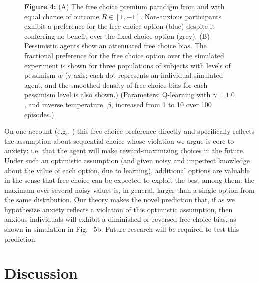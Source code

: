 \documentclass[11pt]{article} %
\begin{document}
\begin{figure}[!b]
  \centerline{%
  }
  \par \textbf{Figure 4:} (A) The free choice premium paradigm from \cite{Leotti2011} and \cite{Leotti2014} with equal chance of outcome $R \in [1, -1]$. Non-anxious participants exhibit a preference for the free choice option (blue) despite it conferring no benefit over the fixed choice option (grey). (B) Pessimistic agents show an attenuated free choice bias. The fractional preference for the free choice option over the simulated experiment is shown for three populations of subjects with levels of pessimism $w$ (y-axis; each dot represents an individual simulated agent, and the smoothed density of free choice bias for each pessimism level is also shown.)
  (Parameters: Q-learning with $\gamma = 1.0$, and inverse temperature, $\beta$, increased from 1 to 10 over 100 episodes.)
\end{figure}

On one account (e.g., \citep{ly2019}) this free choice preference directly and specifically reflects the assumption about sequential choice whose violation we argue is core to anxiety: i.e. that the agent will make reward-maximizing choices in the future. Under such an optimistic assumption (and given noisy and imperfect knowledge about the value of each option, due to learning), additional options are valuable in the sense that free choice can be expected to exploit the best among them: the maximum over several noisy values is, in general, larger than a single option from the same distribution. Our theory makes the novel prediction that, if as we hypothesize anxiety reflects a violation of this optimistic assumption, then anxious individuals will exhibit a diminished or reversed free choice bias, as shown in simulation in Fig. ~5b. Future research will be required to test this prediction.

\section{Discussion}
\end{document}
